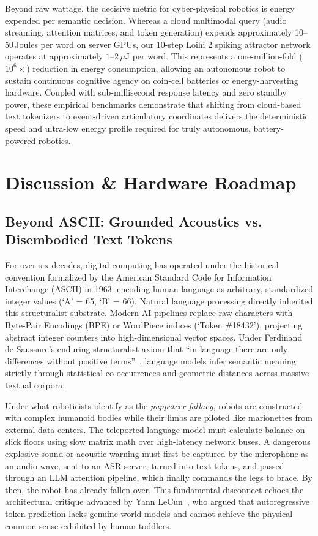 \documentclass[journal,twocolumn]{IEEEtran}
\begin{document}
Beyond raw wattage, the decisive metric for cyber-physical robotics is energy expended per semantic decision. Whereas a cloud multimodal query (audio streaming, attention matrices, and token generation) expends approximately 10--50\,Joules per word on server GPUs, our 10-step Loihi 2 spiking attractor network operates at approximately $1\text{--}2\,\mu\text{J}$ per word. This represents a one-million-fold ($10^6\times$) reduction in energy consumption, allowing an autonomous robot to sustain continuous cognitive agency on coin-cell batteries or energy-harvesting hardware. Coupled with sub-millisecond response latency and zero standby power, these empirical benchmarks demonstrate that shifting from cloud-based text tokenizers to event-driven articulatory coordinates delivers the deterministic speed and ultra-low energy profile required for truly autonomous, battery-powered robotics.

\section{Discussion \& Hardware Roadmap}
\label{sec:discussion}

\subsection{Beyond ASCII: Grounded Acoustics vs. Disembodied Text Tokens}
For over six decades, digital computing has operated under the historical convention formalized by the American Standard Code for Information Interchange (ASCII) in 1963: encoding human language as arbitrary, standardized integer values (`A' = 65, `B' = 66). Natural language processing directly inherited this structuralist substrate. Modern AI pipelines replace raw characters with Byte-Pair Encodings (BPE) or WordPiece indices (`Token \#18432'), projecting abstract integer counters into high-dimensional vector spaces. Under Ferdinand de Saussure's enduring structuralist axiom that ``in language there are only differences without positive terms''~\cite{saussure1916}, language models infer semantic meaning strictly through statistical co-occurrences and geometric distances across massive textual corpora.

Under what roboticists identify as the \emph{puppeteer fallacy}, robots are constructed with complex humanoid bodies while their limbs are piloted like marionettes from external data centers. The teleported language model must calculate balance on slick floors using slow matrix math over high-latency network buses. A dangerous explosive sound or acoustic warning must first be captured by the microphone as an audio wave, sent to an ASR server, turned into text tokens, and passed through an LLM attention pipeline, which finally commands the legs to brace. By then, the robot has already fallen over. This fundamental disconnect echoes the architectural critique advanced by Yann LeCun~\cite{lecun2022}, who argued that autoregressive token prediction lacks genuine world models and cannot achieve the physical common sense exhibited by human toddlers.
\end{document}
